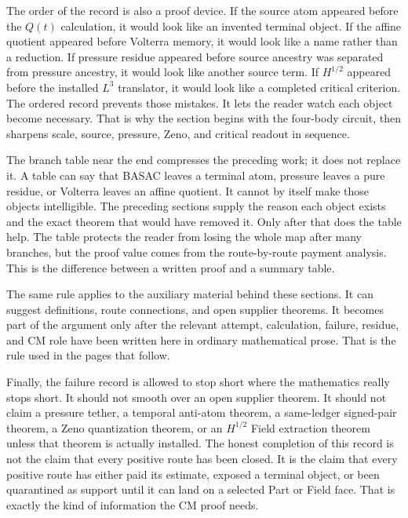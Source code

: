 The order of the record is also a proof device.
If the source atom appeared before the \(Q(t)\) calculation, it would look like
an invented terminal object.
If the affine quotient appeared before Volterra memory, it would look like a
name rather than a reduction.
If pressure residue appeared before source ancestry was separated from
pressure ancestry, it would look like another source term.
If \(H^{1/2}\) appeared before the installed \(L^3\) translator, it would look
like a completed critical criterion.
The ordered record prevents those mistakes.
It lets the reader watch each object become necessary.
That is why the section begins with the four-body circuit, then sharpens scale,
source, pressure, Zeno, and critical readout in sequence.

The branch table near the end compresses the preceding work; it does not
replace it.
A table can say that BASAC leaves a terminal atom, pressure leaves a pure
residue, or Volterra leaves an affine quotient.
It cannot by itself make those objects intelligible.
The preceding sections supply the reason each object exists and the exact
theorem that would have removed it.
Only after that does the table help.
The table protects the reader from losing the whole map after many branches,
but the proof value comes from the route-by-route payment analysis.
This is the difference between a written proof and a summary table.

The same rule applies to the auxiliary material behind these sections.
It can suggest definitions, route connections, and open supplier theorems.
It becomes part of the argument only after the relevant attempt, calculation,
failure, residue, and CM role have been written here in ordinary mathematical
prose.
That is the rule used in the pages that follow.

Finally, the failure record is allowed to stop short where the mathematics
really stops short.
It should not smooth over an open supplier theorem.
It should not claim a pressure tether, a temporal anti-atom theorem, a
same-ledger signed-pair theorem, a Zeno quantization theorem, or an
\(H^{1/2}\) Field extraction theorem unless that theorem is actually installed.
The honest completion of this record is not the claim that every positive
route has been closed.
It is the claim that every positive route has either paid its estimate, exposed
a terminal object, or been quarantined as support until it can land on a
selected Part or Field face.
That is exactly the kind of information the CM proof needs.

